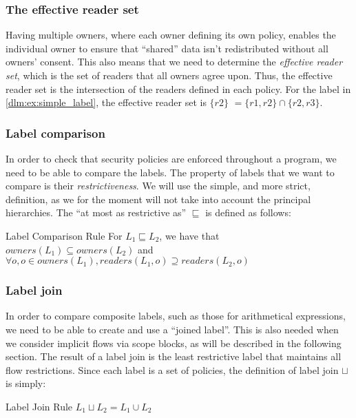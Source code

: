\subsubsection{The effective reader set}
Having multiple owners, where each owner defining its own policy, enables the individual owner to ensure that ``shared'' data isn't redistributed without all owners' consent.
This also means that we need to determine the \emph{effective reader set}, which is the set of readers that all owners agree upon.
Thus, the effective reader set is the intersection of the readers defined in each policy.
For the label in \cref{dlm:ex:simple_label}, the effective reader set is $\{r2\}$ $= \{r1,r2\} \cap \{r2, r3\}$.

\subsubsection{Label comparison}
In order to check that security policies are enforced throughout a program, we need to be able to compare the labels.
The property of labels that we want to compare is their \emph{restrictiveness}.
We will use the simple, and more strict, definition\cite{myers1997}, as we for the moment will not take into account the principal hierarchies.
The ``at most as restrictive as'' $\sqsubseteq$ is defined as follows:

\begin{definition}{Label Comparison Rule}
  For $L_1 \sqsubseteq L_2$, we have that\\
  $owners(L_1) \subseteq owners(L_2)$ and\\
  $\forall o, o \in owners(L_1), readers(L_1, o) \supseteq readers(L_2, o)$
\end{definition}

\subsubsection{Label join}
In order to compare composite labels, such as those for arithmetical expressions, we need to be able to create and use a ``joined label''.
This is also needed when we consider implicit flows via scope blocks, as will be described in the following section.
The result of a label join is the least restrictive label that maintains all flow restrictions.
Since each label is a set of policies, the definition of label join $\sqcup$ is simply:

\begin{definition}{Label Join Rule}
  $L_1 \sqcup L_2 = L_1 \cup L_2$
\end{definition}

